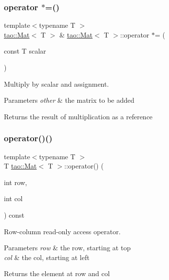 \subsubsection{\texorpdfstring{operator $\ast$=()}{operator *=()}}
{\footnotesize\ttfamily template$<$typename T $>$ \\
\mbox{\hyperlink{classtao_1_1_mat}{tao\+::\+Mat}}$<$ T $>$ \& \mbox{\hyperlink{classtao_1_1_mat}{tao\+::\+Mat}}$<$ T $>$\+::operator $\ast$= (\begin{DoxyParamCaption}\item[{const T}]{scalar }\end{DoxyParamCaption})}



Multiply by scalar and assignment. 


\begin{DoxyParams}{Parameters}
{\em other} & the matrix to be added \\
\hline
\end{DoxyParams}
\begin{DoxyReturn}{Returns}
the result of multiplication as a reference 
\end{DoxyReturn}
\mbox{\label{classtao_1_1_mat_a814d02bbf96dab62938912f792aa7994}} 
\subsubsection{\texorpdfstring{operator()()}{operator()()}\hspace{0.1cm}{\footnotesize\ttfamily [1/2]}}
{\footnotesize\ttfamily template$<$typename T $>$ \\
T \mbox{\hyperlink{classtao_1_1_mat}{tao\+::\+Mat}}$<$ T $>$\+::operator() (\begin{DoxyParamCaption}\item[{int}]{row,  }\item[{int}]{col }\end{DoxyParamCaption}) const}



Row-\/column read-\/only access operator. 


\begin{DoxyParams}{Parameters}
{\em row} & the row, starting at top \\
\hline
{\em col} & the col, starting at left \\
\hline
\end{DoxyParams}
\begin{DoxyReturn}{Returns}
the element at row and col 
\end{DoxyReturn}
\mbox{\label{classtao_1_1_mat_ac0372cf9e7da0ab734e7c58888e5d85a}} 
